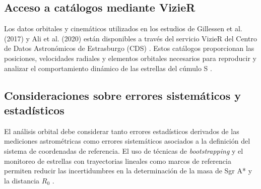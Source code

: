 \documentclass[a4paper]{article}
\begin{document}
\subsection{Acceso a catálogos mediante VizieR}
Los datos orbitales y cinemáticos utilizados en los estudios de Gillessen et al. (2017) y Ali et al. (2020) están disponibles a través del servicio VizieR del Centro de Datos Astronómicos de Estrasburgo (CDS) \cite{ochsenbein2000vizier}. Estos catálogos proporcionan las posiciones, velocidades radiales y elementos orbitales necesarios para reproducir y analizar el comportamiento dinámico de las estrellas del cúmulo S \cite{vizier_gillessen2017, vizier_ali2020}.

\subsection{Consideraciones sobre errores sistemáticos y estadísticos}
El análisis orbital debe considerar tanto errores estadísticos derivados de las mediciones astrométricas como errores sistemáticos asociados a la definición del sistema de coordenadas de referencia. El uso de técnicas de \textit{bootstrapping} y el monitoreo de estrellas con trayectorias lineales como marcos de referencia permiten reducir las incertidumbres en la determinación de la masa de Sgr A* y la distancia $R_0$ \cite{gillessen2017update, ali2020kinematic}.



\end{document}
